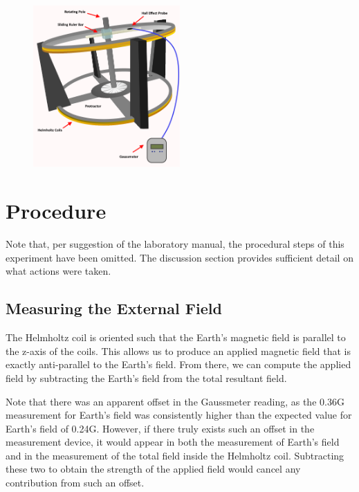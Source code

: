 \documentclass[a4paper]{article}
\begin{document}
\begin{figure}[h]
\centering
\includegraphics[width=0.5\textwidth]{helmholtz_diagram.png}
\label{helmholtz_diagram}
\end{figure}

\section{Procedure}

Note that, per suggestion of the laboratory manual, the procedural steps of this experiment have been omitted. The discussion section provides sufficient detail on what actions were taken.

\subsection{Measuring the External Field}
The Helmholtz coil is oriented such that the Earth's magnetic field is parallel to the z-axis of the coils. This allows us to produce an applied magnetic field that is exactly anti-parallel to the Earth's field. From there, we can compute the applied field by subtracting the Earth's field from the total resultant field.

Note that there was an apparent offset in the Gaussmeter reading, as the 0.36G measurement for Earth's field was consistently higher than the expected value for Earth's field of 0.24G. However, if there truly exists such an offset in the measurement device, it would appear in both the measurement of Earth's field and in the measurement of the total field inside the Helmholtz coil. Subtracting these two to obtain the strength of the applied field would cancel any contribution from such an offset.
\end{document}
